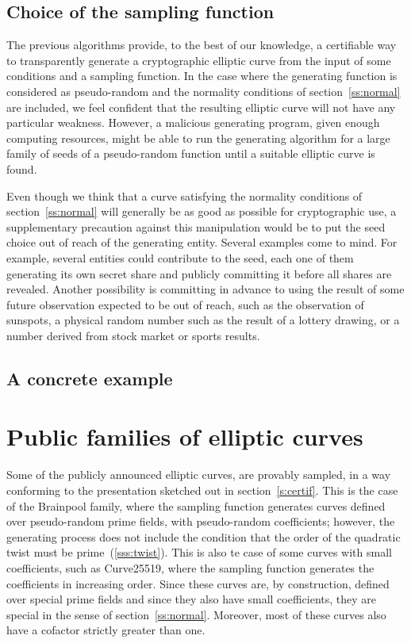 \documentclass[twocolumn,letterpaper,10pt]{article}
\begin{document}
\subsection{Choice of the sampling function}

The previous algorithms provide, to the best of our knowledge,
a certifiable way to transparently generate a cryptographic elliptic curve
from the input of some conditions and a sampling function.
In the case where the generating function is considered as pseudo-random
and the normality conditions of section~\ref{ss:normal} are included,
we feel confident that the resulting elliptic curve
will not have any particular weakness.
However, a malicious generating program, given enough computing resources,
might be able to run the generating algorithm
for a large family of seeds of a pseudo-random function
until a suitable elliptic curve is found.

Even though we think that a curve satisfying the normality conditions
of section~\ref{ss:normal} will generally be as good as possible
for cryptographic use,
a supplementary precaution against this manipulation
would be to put the seed choice out of reach of the generating entity.
Several examples come to mind.
For example, several entities could contribute to the seed,
each one of them generating its own secret share
and publicly committing it before all shares are revealed.
Another possibility is committing in advance to using
the result of some future observation expected to be out of reach,
such as the observation of sunspots,
a physical random number such as the result of a lottery drawing,
or a number derived from stock market or sports results.

\subsection{A concrete example}


\section{Public families of elliptic curves}

Some of the publicly announced elliptic curves,
are provably sampled, in a way conforming to the presentation
sketched out in section~\ref{s:certif}.
This is the case of the Brainpool family,
where the sampling function generates
curves defined over pseudo-random prime fields,
with pseudo-random coefficients;
however, the generating process does not include
the condition that the order of the quadratic twist must be
prime~(\ref{sss:twist}).
This is also te case of some curves with small coefficients,
such as Curve25519,
where the sampling function generates the coefficients
in increasing order.
Since these curves are, by construction,
defined over special prime fields
and since they also have small coefficients,
they are special in the sense of section~\ref{ss:normal}.
Moreover, most of these curves
also have a cofactor strictly greater than one.
\end{document}
